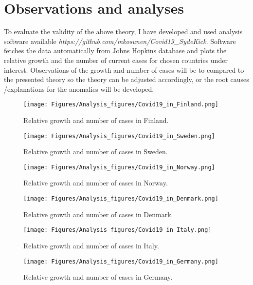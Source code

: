 \chapter{Observations and analyses}\label{chap:observations}
To evaluate the validity of the above theory, I have developed and used analysis software
available \emph{https://github.com/mkosunen/Covid19\_SydeKick}. Software
fetches the data automatically from Johns Hopkins database and plots the
relative growth and the number of current cases for chosen countries under
interest. Observations of the growth and number of cases will be to compared
to the presented theory so the theory can be adjusted accordingly, or the
root causes /explanations for the anomalies will be developed. 

\begin{figure}
    \centering
    \texttt{[image: Figures/Analysis\_figures/Covid19\_in\_Finland.png]}
    \caption{Relative growth and number of cases in Finland.}\label{fig:Finland}
\end{figure}

\begin{figure}
    \centering
    \texttt{[image: Figures/Analysis\_figures/Covid19\_in\_Sweden.png]}
    \caption{Relative growth and number of cases in Sweden.}\label{fig:Sweden}
\end{figure}

\begin{figure}
    \centering
    \texttt{[image: Figures/Analysis\_figures/Covid19\_in\_Norway.png]}
    \caption{Relative growth and number of cases in Norway.}\label{fig:Norway}
\end{figure}

\begin{figure}
    \centering
    \texttt{[image: Figures/Analysis\_figures/Covid19\_in\_Denmark.png]}
    \caption{Relative growth and number of cases in Denmark.}\label{fig:Denmark}
\end{figure}
\begin{figure}
    \centering
    \texttt{[image: Figures/Analysis\_figures/Covid19\_in\_Italy.png]}
    \caption{Relative growth and number of cases in Italy.}\label{fig:Italy}
\end{figure}

\begin{figure}
    \centering
    \texttt{[image: Figures/Analysis\_figures/Covid19\_in\_Germany.png]}
    \caption{Relative growth and number of cases in Germany.}\label{fig:Germany}
\end{figure}

